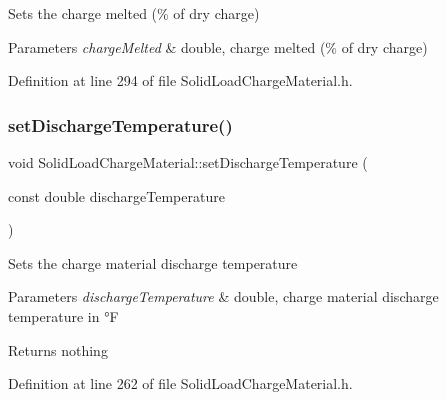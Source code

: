 Sets the charge melted (\% of dry charge) 
\begin{DoxyParams}{Parameters}
{\em charge\+Melted} & double, charge melted (\% of dry charge) \\
\hline
\end{DoxyParams}


Definition at line 294 of file Solid\+Load\+Charge\+Material.\+h.

\mbox{\label{class_solid_load_charge_material_adf73bc8d656a501cae5ad68af7a7c4fb}} 
\subsubsection{\texorpdfstring{set\+Discharge\+Temperature()}{setDischargeTemperature()}\hspace{0.1cm}{\footnotesize\ttfamily [1/3]}}
{\footnotesize\ttfamily void Solid\+Load\+Charge\+Material\+::set\+Discharge\+Temperature (\begin{DoxyParamCaption}\item[{const double}]{discharge\+Temperature }\end{DoxyParamCaption})\hspace{0.3cm}{\ttfamily [inline]}}

Sets the charge material discharge temperature 
\begin{DoxyParams}{Parameters}
{\em discharge\+Temperature} & double, charge material discharge temperature in °F \\
\hline
\end{DoxyParams}
\begin{DoxyReturn}{Returns}
nothing 
\end{DoxyReturn}


Definition at line 262 of file Solid\+Load\+Charge\+Material.\+h.

\mbox{\label{class_solid_load_charge_material_adf73bc8d656a501cae5ad68af7a7c4fb}} 
